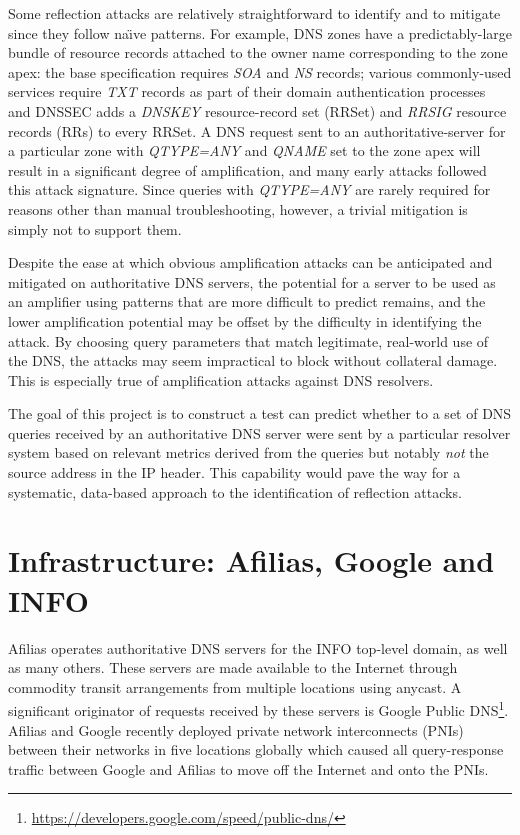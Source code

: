 \documentclass[9pt,technote,letterpaper]{IEEEtran}
\begin{document}
Some reflection attacks are relatively straightforward to identify and to mitigate since they follow na\"\i ve patterns. For example, DNS zones have a predictably-large bundle of resource records attached to the owner name corresponding to the zone apex: the base specification requires \emph{SOA} and \emph{NS} records; various commonly-used services require \emph{TXT} records as part of their domain authentication processes and DNSSEC adds a \emph{DNSKEY}  resource-record set (RRSet) and \emph{RRSIG} resource records (RRs) to every RRSet. A DNS request sent to an authoritative-server for a particular zone with \emph{QTYPE=ANY} and \emph{QNAME} set to the zone apex will result in a significant degree of amplification, and many early attacks followed this attack signature. Since queries with \emph{QTYPE=ANY} are rarely required for reasons other than manual troubleshooting, however, a trivial mitigation is simply not to support them\cite{I-D.ietf-dnsop-refuse-any}.

Despite the ease at which obvious amplification attacks can be anticipated and mitigated on authoritative DNS servers, the potential for a server to be used as an amplifier using patterns that are more difficult to predict remains, and the lower amplification potential may be offset by the difficulty in identifying the attack. By choosing query parameters that match legitimate, real-world use of the DNS, the attacks may seem impractical to block without collateral damage. This is especially true of amplification attacks against DNS resolvers.

The goal of this project is to construct a test can predict whether to a set of DNS queries received by an authoritative DNS server were sent by a particular resolver system based on relevant metrics derived from the queries but notably \emph{not} the source address in the IP header. This capability would pave the way for a systematic, data-based approach to the identification of reflection attacks.

\section{Infrastructure: Afilias, Google and INFO}
Afilias operates authoritative DNS servers for the INFO top-level domain, as well as many others. These servers are made available to the Internet through commodity transit arrangements from multiple locations using anycast\cite{RFC4786}. A significant originator of requests received by these servers is Google Public DNS\footnote{\url{https://developers.google.com/speed/public-dns/}}. Afilias and Google recently deployed private network interconnects (PNIs) between their networks in five locations globally which caused all query-response traffic between Google and Afilias to move off the Internet and onto the PNIs.
\end{document}
